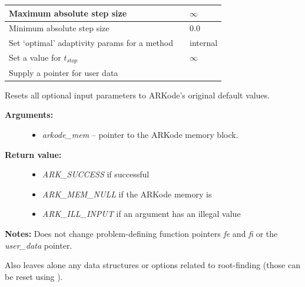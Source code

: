 \documentclass[letterpaper,10pt,english]{sphinxmanual}
\begin{document}
\begin{tabulary}{\linewidth}{|L|L|L|}
Maximum absolute step size
 & 
{\hyperref[c_interface/User_callable:ARKodeSetMaxStep]{}}
 & 
$\infty$
\\\hline

Minimum absolute step size
 & 
{\hyperref[c_interface/User_callable:ARKodeSetMinStep]{}}
 & 
0.0
\\\hline

Set `optimal' adaptivity params for a method
 & 
{\hyperref[c_interface/User_callable:ARKodeSetOptimalParams]{}}
 & 
internal
\\\hline

Set a value for $t_{stop}$
 & 
{\hyperref[c_interface/User_callable:ARKodeSetStopTime]{}}
 & 
$\infty$
\\\hline

Supply a pointer for user data
 & 
{\hyperref[c_interface/User_callable:ARKodeSetUserData]{}}
 & 
\\\hline
\end{tabulary}


\begin{fulllineitems}
\label{c_interface/User_callable:ARKodeSetDefaults}
Resets all optional input parameters to ARKode's original
default values.
\begin{description}
\item[{\textbf{Arguments:}}] \leavevmode\begin{itemize}
\item {} 
\emph{arkode\_mem} -- pointer to the ARKode memory block.

\end{itemize}

\item[{\textbf{Return value:}}] \leavevmode\begin{itemize}
\item {} 
\emph{ARK\_SUCCESS} if successful

\item {} 
\emph{ARK\_MEM\_NULL} if the ARKode memory is 

\item {} 
\emph{ARK\_ILL\_INPUT} if an argument has an illegal value

\end{itemize}

\end{description}

\textbf{Notes:} Does not change problem-defining function pointers \emph{fe}
and \emph{fi} or the \emph{user\_data} pointer.

Also leaves alone any data structures or options related to
root-finding (those can be reset using {\hyperref[c_interface/User_callable:ARKodeRootInit]{}}).

\end{fulllineitems}
\end{document}
